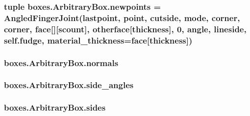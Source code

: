 \subsubsection[{newpoints}]{\setlength{\rightskip}{0pt plus 5cm}tuple boxes.\+Arbitrary\+Box.\+newpoints = {\bf Angled\+Finger\+Joint}(lastpoint, point, cutside, mode, {\bf corner}, {\bf corner}, face\mbox{[}\textquotesingle{}\mbox{]}\mbox{[}scount\mbox{]}, otherface\mbox{[}\textquotesingle{}thickness\textquotesingle{}\mbox{]}, 0, {\bf angle}, {\bf lineside}, self.\+fudge, material\+\_\+thickness=face\mbox{[}\textquotesingle{}thickness\textquotesingle{}\mbox{]})\hspace{0.3cm}{\ttfamily [static]}}\label{classboxes_1_1_arbitrary_box_abedf2ff5c000b46d146b0b11e5872bf7}
\hypertarget{classboxes_1_1_arbitrary_box_aa4c61dd48b10ff63eb8f4889d55934f6}{}
\subsubsection[{normals}]{\setlength{\rightskip}{0pt plus 5cm}boxes.\+Arbitrary\+Box.\+normals}\label{classboxes_1_1_arbitrary_box_aa4c61dd48b10ff63eb8f4889d55934f6}
\hypertarget{classboxes_1_1_arbitrary_box_a26b3d077741f59e0f58fa8b6307d1958}{}
\subsubsection[{side\+\_\+angles}]{\setlength{\rightskip}{0pt plus 5cm}boxes.\+Arbitrary\+Box.\+side\+\_\+angles}\label{classboxes_1_1_arbitrary_box_a26b3d077741f59e0f58fa8b6307d1958}
\hypertarget{classboxes_1_1_arbitrary_box_a3c4f3f9e42118cbe79d0d8be915bfe4f}{}
\subsubsection[{sides}]{\setlength{\rightskip}{0pt plus 5cm}boxes.\+Arbitrary\+Box.\+sides}\label{classboxes_1_1_arbitrary_box_a3c4f3f9e42118cbe79d0d8be915bfe4f}
\hypertarget{classboxes_1_1_arbitrary_box_aa3f4f131456dc23999d99a422041c842}{}
